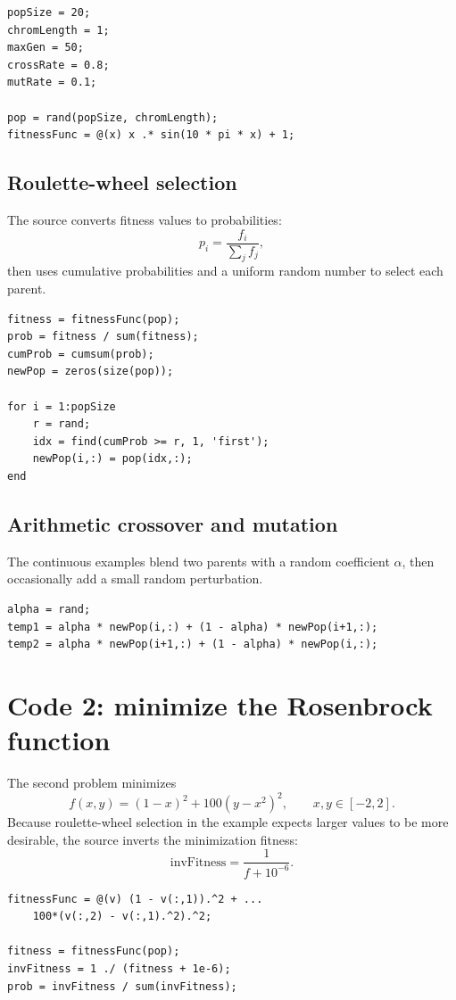 \begin{lstlisting}[style=mlmatlab]
popSize = 20;
chromLength = 1;
maxGen = 50;
crossRate = 0.8;
mutRate = 0.1;

pop = rand(popSize, chromLength);
fitnessFunc = @(x) x .* sin(10 * pi * x) + 1;
\end{lstlisting}

\subsection{Roulette-wheel selection}

The source converts fitness values to probabilities:
\[
p_i=\frac{f_i}{\sum_j f_j},
\]
then uses cumulative probabilities and a uniform random number to select each parent.

\begin{lstlisting}[style=mlmatlab]
fitness = fitnessFunc(pop);
prob = fitness / sum(fitness);
cumProb = cumsum(prob);
newPop = zeros(size(pop));

for i = 1:popSize
    r = rand;
    idx = find(cumProb >= r, 1, 'first');
    newPop(i,:) = pop(idx,:);
end
\end{lstlisting}

\subsection{Arithmetic crossover and mutation}

The continuous examples blend two parents with a random coefficient \(\alpha\), then occasionally add a small random perturbation.

\begin{lstlisting}[style=mlmatlab]
alpha = rand;
temp1 = alpha * newPop(i,:) + (1 - alpha) * newPop(i+1,:);
temp2 = alpha * newPop(i+1,:) + (1 - alpha) * newPop(i,:);
\end{lstlisting}

\section{Code 2: minimize the Rosenbrock function}

The second problem minimizes
\[
f(x,y)=(1-x)^2+100(y-x^2)^2,
\qquad x,y\in[-2,2].
\]
Because roulette-wheel selection in the example expects larger values to be more desirable, the source inverts the minimization fitness:
\[
\text{invFitness}=\frac{1}{f+10^{-6}}.
\]

\begin{lstlisting}[style=mlmatlab]
fitnessFunc = @(v) (1 - v(:,1)).^2 + ...
    100*(v(:,2) - v(:,1).^2).^2;

fitness = fitnessFunc(pop);
invFitness = 1 ./ (fitness + 1e-6);
prob = invFitness / sum(invFitness);
\end{lstlisting}

